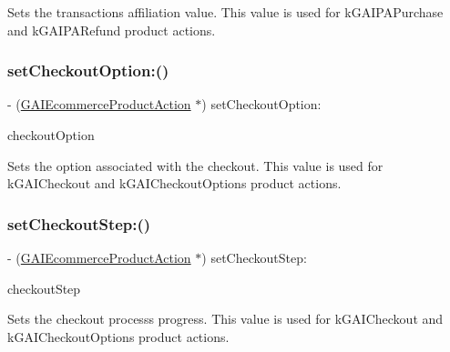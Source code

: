Sets the transaction\textquotesingle{}s affiliation value. This value is used for k\+G\+A\+I\+P\+A\+Purchase and k\+G\+A\+I\+P\+A\+Refund product actions. \mbox{\label{interface_g_a_i_ecommerce_product_action_a1f4cfccfdef393473652746e0e81209c}} 
\subsubsection{\texorpdfstring{set\+Checkout\+Option\+:()}{setCheckoutOption:()}}
{\footnotesize\ttfamily -\/ (\hyperlink{interface_g_a_i_ecommerce_product_action}{G\+A\+I\+Ecommerce\+Product\+Action} $\ast$) set\+Checkout\+Option\+: \begin{DoxyParamCaption}\item[{(N\+S\+String $\ast$)}]{checkout\+Option }\end{DoxyParamCaption}}

Sets the option associated with the checkout. This value is used for k\+G\+A\+I\+Checkout and k\+G\+A\+I\+Checkout\+Options product actions. \mbox{\label{interface_g_a_i_ecommerce_product_action_ac4bcb2439fb133fb049f59c740d94dde}} 
\subsubsection{\texorpdfstring{set\+Checkout\+Step\+:()}{setCheckoutStep:()}}
{\footnotesize\ttfamily -\/ (\hyperlink{interface_g_a_i_ecommerce_product_action}{G\+A\+I\+Ecommerce\+Product\+Action} $\ast$) set\+Checkout\+Step\+: \begin{DoxyParamCaption}\item[{(N\+S\+Number $\ast$)}]{checkout\+Step }\end{DoxyParamCaption}}

Sets the checkout process\textquotesingle{}s progress. This value is used for k\+G\+A\+I\+Checkout and k\+G\+A\+I\+Checkout\+Options product actions. \mbox{\label{interface_g_a_i_ecommerce_product_action_a4ef010bcb348cc92071fac8ee45cb488}} 
